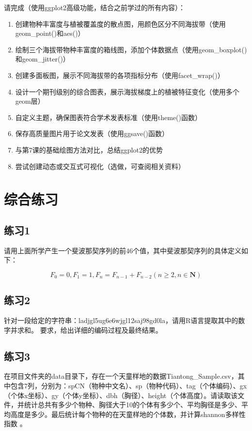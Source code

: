 \documentclass[
  twoside]{book}
\begin{document}
请完成（使用ggplot2高级功能，结合之前学过的所有内容）：

\begin{enumerate}
\def\labelenumi{\arabic{enumi}.}
\item
  创建物种丰富度与植被覆盖度的散点图，用颜色区分不同海拔带（使用geom\_point()和aes()）
\item
  绘制三个海拔带物种丰富度的箱线图，添加个体数据点（使用geom\_boxplot()和geom\_jitter()）
\item
  创建多面板图，展示不同海拔带的各项指标分布（使用facet\_wrap()）
\item
  设计一个期刊级别的综合图表，展示海拔梯度上的植被特征变化（使用多个geom层）
\item
  自定义主题，确保图表符合学术发表标准（使用theme()函数）
\item
  保存高质量图片用于论文发表（使用ggsave()函数）
\item
  与第7课的基础绘图方法对比，总结ggplot2的优势
\item
  尝试创建动态或交互式可视化（选做，可查阅相关资料）
\end{enumerate}

\hypertarget{ux7efcux5408ux7ec3ux4e60-1}{%
\section{综合练习}\label{ux7efcux5408ux7ec3ux4e60-1}}

\hypertarget{ux7ec3ux4e601-1}{%
\subsection{练习1}\label{ux7ec3ux4e601-1}}

请用上面所学产生一个斐波那契序列的前46个值，其中斐波那契序列的具体定义如下：

\[F_0=0, F_1=1, F_n=F_{n-1}+F_{n-2} (n \ge 2,n \in \mathbf{N})\]

\hypertarget{ux7ec3ux4e602}{%
\subsection{练习2}\label{ux7ec3ux4e602}}

针对一段给定的字符串：ladjgl5ug6e6wjgl12saj98gd0la，请用R语言提取其中的数字并求和。
要求，给出详细的编码过程及最终结果。

\hypertarget{ux7ec3ux4e603}{%
\subsection{练习3}\label{ux7ec3ux4e603}}

在项目文件夹的data目录下，存在一个天童样地的数据Tiantong\_Sample.csv，其中包含7列，分别为：spCN（物种中文名）、sp（物种代码）、tag（个体编码）、gx（个体x坐标）、gy（个体y坐标）、dbh（胸径）、height（个体高度）。请读取该文件，并统计总共有多少个物种、胸径大于10的个体有多少个、平均胸径是多少、平均高度是多少。最后统计每个物种的在天童样地的个体数，并计算shannon多样性指数 。

  
\end{document}
